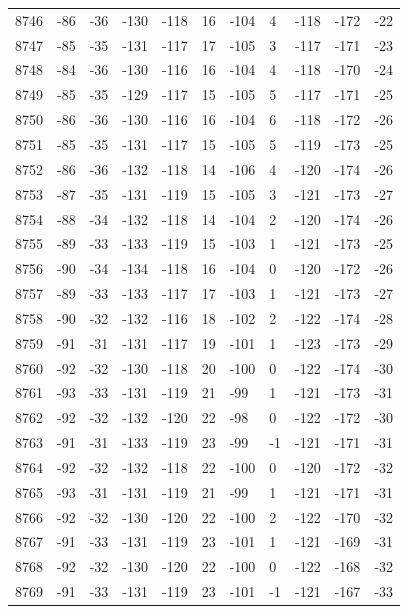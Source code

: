 \begin{table}[H]
\begin{tabular}{lllllllllll}
8746 & -86 & -36 & -130 & -118 & 16 & -104 & 4 & -118 & -172 & -22 \\
8747 & -85 & -35 & -131 & -117 & 17 & -105 & 3 & -117 & -171 & -23 \\
8748 & -84 & -36 & -130 & -116 & 16 & -104 & 4 & -118 & -170 & -24 \\
8749 & -85 & -35 & -129 & -117 & 15 & -105 & 5 & -117 & -171 & -25 \\
8750 & -86 & -36 & -130 & -116 & 16 & -104 & 6 & -118 & -172 & -26 \\
8751 & -85 & -35 & -131 & -117 & 15 & -105 & 5 & -119 & -173 & -25 \\
8752 & -86 & -36 & -132 & -118 & 14 & -106 & 4 & -120 & -174 & -26 \\
8753 & -87 & -35 & -131 & -119 & 15 & -105 & 3 & -121 & -173 & -27 \\
8754 & -88 & -34 & -132 & -118 & 14 & -104 & 2 & -120 & -174 & -26 \\
8755 & -89 & -33 & -133 & -119 & 15 & -103 & 1 & -121 & -173 & -25 \\
8756 & -90 & -34 & -134 & -118 & 16 & -104 & 0 & -120 & -172 & -26 \\
8757 & -89 & -33 & -133 & -117 & 17 & -103 & 1 & -121 & -173 & -27 \\
8758 & -90 & -32 & -132 & -116 & 18 & -102 & 2 & -122 & -174 & -28 \\
8759 & -91 & -31 & -131 & -117 & 19 & -101 & 1 & -123 & -173 & -29 \\
8760 & -92 & -32 & -130 & -118 & 20 & -100 & 0 & -122 & -174 & -30 \\
8761 & -93 & -33 & -131 & -119 & 21 & -99 & 1 & -121 & -173 & -31 \\
8762 & -92 & -32 & -132 & -120 & 22 & -98 & 0 & -122 & -172 & -30 \\
8763 & -91 & -31 & -133 & -119 & 23 & -99 & -1 & -121 & -171 & -31 \\
8764 & -92 & -32 & -132 & -118 & 22 & -100 & 0 & -120 & -172 & -32 \\
8765 & -93 & -31 & -131 & -119 & 21 & -99 & 1 & -121 & -171 & -31 \\
8766 & -92 & -32 & -130 & -120 & 22 & -100 & 2 & -122 & -170 & -32 \\
8767 & -91 & -33 & -131 & -119 & 23 & -101 & 1 & -121 & -169 & -31 \\
8768 & -92 & -32 & -130 & -120 & 22 & -100 & 0 & -122 & -168 & -32 \\
8769 & -91 & -33 & -131 & -119 & 23 & -101 & -1 & -121 & -167 & -33 \\

\end{tabular}
\end{table}
